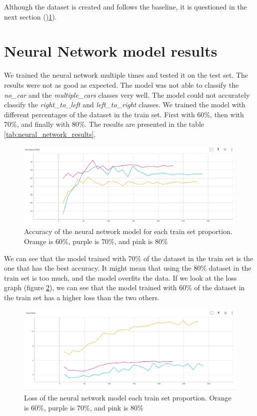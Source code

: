 Although the dataset is created and follows the baseline, it is questioned in the next section ()\ref{sec:neural_network_results}).

\section{Neural Network model results}
\label{sec:neural_network_results}

We trained the neural network multiple times and tested it on the test set. The results were not as good as expected. The model was not able to classify the \textit{no\_car} and the \textit{multiple\_cars} classes very well. The model could not accurately classify the \textit{right\_to\_left} and \textit{left\_to\_right} classes. We trained the model with different percentages of the dataset in the train set. First with 60\%, then with 70\%, and finally with 80\%.
The results are presented in the table \ref{tab:neural_network_results}.

\begin{figure}[H]
    \centering
    \includegraphics[width=1\textwidth]{images/accuracy_test.png}
    \caption{Accuracy of the neural network model for each train set proportion. Orange is 60\%, purple is 70\%, and pink is 80\%}
    \label{ftab:neural_network_results}
\end{figure}

We can see that the model trained with 70\% of the dataset in the train set is the one that has the best accuracy. It might mean that using the 80\% dataset in the train set is too much, and the model overfits the data. If we look at the loss graph (figure \ref{fig:loss_test}), we can see that the model trained with 60\% of the dataset in the train set has a higher loss than the two others. 

\begin{figure}[H]
    \centering
    \includegraphics[width=1\textwidth]{images/loss_test.png}
    \caption{Loss of the neural network model each train set proportion. Orange is 60\%, purple is 70\%, and pink is 80\%}
    \label{fig:loss_test}
\end{figure}


